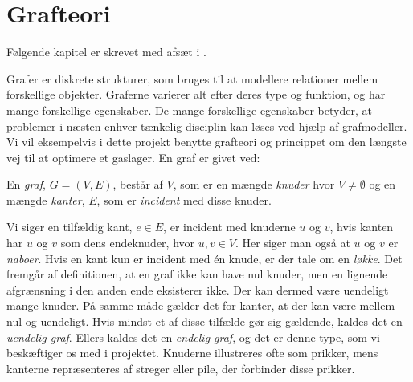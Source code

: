\chapter{Grafteori}
Følgende kapitel er skrevet med afsæt i \citep{dmat}.

Grafer er diskrete strukturer, som bruges til at modellere relationer mellem forskellige objekter.  Graferne varierer alt efter deres type og funktion, og har mange forskellige egenskaber. De mange forskellige egenskaber betyder, at problemer i næsten enhver tænkelig disciplin kan løses ved hjælp af grafmodeller. Vi vil eksempelvis i dette projekt benytte grafteori og princippet om den længste vej til at optimere et gaslager. En graf er givet ved:
\begin{defn}[Graf]
En \emph{graf}, $G = (V,E)$, består af $V$, som er en mængde \emph{knuder} hvor $V \neq \emptyset$ og en mængde \emph{kanter}, $E$, som er \emph{incident} med disse knuder. 
\end{defn}

Vi siger en tilfældig kant, $e \in E$, er incident med knuderne $u$ og $v$, hvis kanten har $u$ og $v$ som dens endeknuder, hvor $u, v \in V$. Her siger man også at $u$ og $v$ er \emph{naboer}. Hvis en kant kun er incident med én knude, er der tale om en \emph{løkke}.
Det fremgår af definitionen, at en graf ikke kan have nul knuder, men en lignende afgrænsning i den anden ende eksisterer ikke. Der kan dermed være uendeligt mange knuder. På samme måde gælder det for kanter, at der kan være mellem nul og uendeligt. Hvis mindst et af disse tilfælde gør sig gældende, kaldes det en \emph{uendelig graf}. Ellers kaldes det en \emph{endelig graf}, og det er denne type, som vi beskæftiger os med i projektet.
Knuderne illustreres ofte som prikker, mens kanterne repræsenteres af streger eller pile, der forbinder disse prikker. 
















